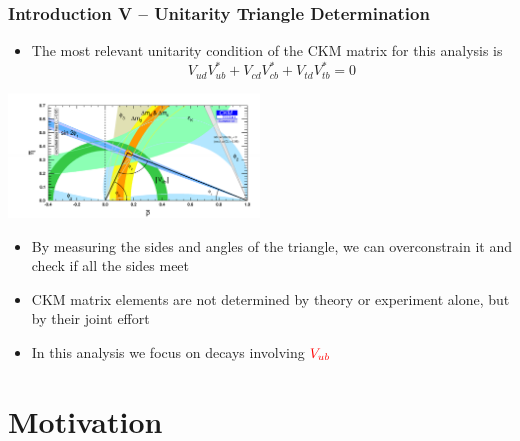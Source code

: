 \documentclass[serif]{beamer}
\begin{document}
\begin{frame}[t]
\frametitle{Introduction V -- Unitarity Triangle Determination}
\small
\vspace{-3mm}
\begin{block}{}
	\begin{itemize}
		\item The most relevant unitarity condition of the CKM matrix for this analysis is
		$$V_{ud}V_{ub}^{*}+V_{cd}V_{cb}^{*}+V_{td}V_{tb}^{*} = 0$$
	\end{itemize}
\end{block}
\vspace{-2mm}

\begin{center}
		\includegraphics[width=0.5\textwidth]{fig/belle_rhoeta_small_global}
\end{center}

\vspace{-2mm}

	\begin{block}{}
		\begin{itemize}
			\item By measuring the sides and angles of the triangle, we can overconstrain it and check if all the sides meet
			\item CKM matrix elements are not determined by theory or experiment alone, but by their joint effort
			\item In this analysis we focus on decays involving $\textcolor{red}{V_{ub}}$
		\end{itemize}
	\end{block}
	

\end{frame}

\section{Motivation} 
\end{document}
